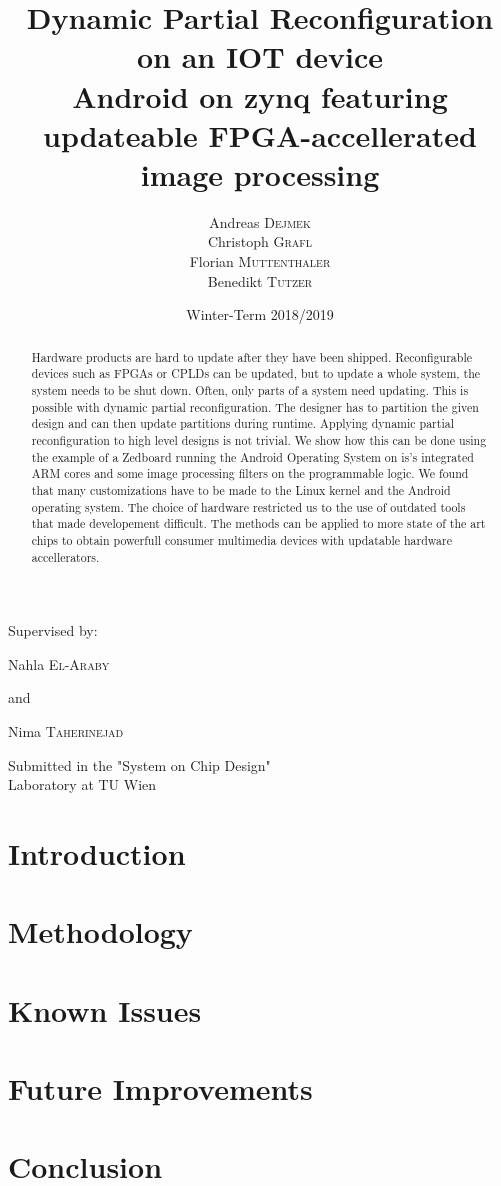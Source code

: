 \documentclass{article}
\title{Dynamic Partial Reconfiguration on an IOT device\\
\vspace{1em}
Android on zynq featuring updateable FPGA-accellerated image processing}
\author{Andreas \textsc{Dejmek}\\ Christoph \textsc{Grafl} \\
	Florian \textsc{Muttenthaler} \\ Benedikt \textsc{Tutzer}}
\date{Winter-Term 2018/2019}
\begin{document}
\maketitle
\begin{center}
	Supervised by:

	Nahla \textsc{El-Araby}

	and

	Nima \textsc{Taherinejad}
\end{center}
\begin{abstract}
	Hardware products are hard to update after they have been shipped.
	Reconfigurable devices such as FPGAs or CPLDs can be updated, but to
	update a whole system, the system needs to be shut down.
	Often, only parts of a system need updating.
	This is possible with dynamic partial reconfiguration.
	The designer has to partition the given design and can then update
	partitions during runtime.
	Applying dynamic partial reconfiguration to high level designs is not
	trivial.
	We show how this can be done using the example of a Zedboard running the
	Android Operating System on is's integrated ARM cores and some image
	processing filters on the programmable logic.
	We found that many customizations have to be made to the Linux kernel
	and the Android operating system.
	The choice of hardware restricted us to the use of outdated tools that
	made developement difficult.
	The methods can be applied to more state of the art chips to obtain
	powerfull consumer multimedia devices with updatable hardware
	accellerators.
\end{abstract}
\begin{center}
	Submitted in the "System on Chip Design"\\Laboratory at TU Wien


\end{center}
\pagebreak
\tableofcontents
\pagebreak
\section{Introduction}\label{sec:introduction}

\section{Methodology}\label{sec:methodology}

\section{Known Issues}\label{sec:knownissues}

\section{Future Improvements}\label{sec:futureimprovements}

\section{Conclusion}\label{sec:conclusion}



\end{document}
